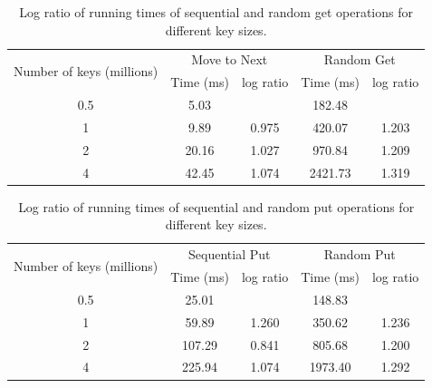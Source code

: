 \begin{table}[hbtp]
\centering
\label{fig:logRatioGetAnalysis}
\begin{tabular}{|c|c|c|c|c|}
\hline
\multirow{2}{*}{Number of keys (millions)} & \multicolumn{2}{c|}{Move to Next} & \multicolumn{2}{c|}{Random Get} \\ \cline{2-5} 
                                           & Time (ms)       & log ratio       & Time (ms)      & log ratio      \\ \hline
0.5                                        & 5.03            &                 & 182.48         &                \\ \hline
1                                          & 9.89            & 0.975           & 420.07         & 1.203          \\ \hline
2                                          & 20.16           & 1.027           & 970.84         & 1.209          \\ \hline
4                                          & 42.45           & 1.074           & 2421.73        & 1.319          \\ \hline
\end{tabular}
\caption{Log ratio of running times of sequential and random get operations for different key sizes.}
\end{table}

\begin{table}[htbp]
\centering
\label{fig:logRatioPutAnalysis}
\begin{tabular}{|c|c|c|c|c|}
\hline
\multirow{2}{*}{Number of keys (millions)} & \multicolumn{2}{c|}{Sequential Put} & \multicolumn{2}{c|}{Random Put} \\ \cline{2-5} 
                                           & Time (ms)       & log ratio       & Time (ms)      & log ratio      \\ \hline
0.5                                        & 25.01           &                 & 148.83         &                \\ \hline
1                                          & 59.89           & 1.260           & 350.62         & 1.236          \\ \hline
2                                          & 107.29          & 0.841           & 805.68         & 1.200          \\ \hline
4                                          & 225.94          & 1.074           & 1973.40        & 1.292          \\ \hline
\end{tabular}
\caption{Log ratio of running times of sequential and random put operations for different key sizes.}
\end{table}

